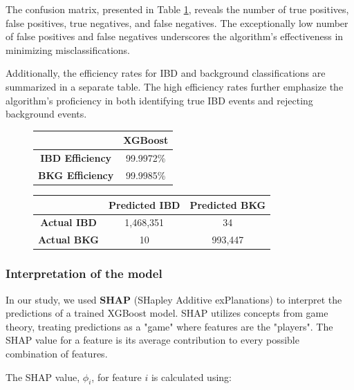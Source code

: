 The confusion matrix, presented in Table \ref{tab:conf_matrix_xgb}, reveals the number of true positives, false positives, true negatives, and false negatives. The exceptionally low number of false positives and false negatives underscores the algorithm's effectiveness in minimizing misclassifications.

Additionally, the efficiency rates for IBD and background classifications are summarized in a separate table. The high efficiency rates further emphasize the algorithm's proficiency in both identifying true IBD events and rejecting background events.


\begin{figure}[h]
	\centering
	\begin{minipage}{0.33\textwidth}
	\centering
	\begin{tabular}{cc}
		\toprule
		& \textbf{XGBoost} \\
		\midrule
		\textbf{IBD Efficiency} & 99.9972\% \\
		\textbf{BKG Efficiency} & 99.9985\% \\
		\bottomrule
	\end{tabular}
	\end{minipage}
	\begin{minipage}{0.65\textwidth}
	\centering
	\begin{tabular}{ccc}
		\toprule
		& \textbf{Predicted IBD} & \textbf{Predicted BKG} \\
		\midrule
		\textbf{Actual IBD} & 1,468,351 & 34 \\
		\textbf{Actual BKG} & 10 & 993,447 \\
		\bottomrule
	\end{tabular}
	\label{tab:conf_matrix_xgb}
\end{minipage}
\end{figure}




\subsubsection{Interpretation of the model}
In our study, we used \textbf{SHAP} (SHapley Additive exPlanations) to interpret the predictions of a trained XGBoost model. SHAP utilizes concepts from game theory, treating predictions as a "game" where features are the "players". The SHAP value for a feature is its average contribution to every possible combination of features.

The SHAP value, \(\phi_i\), for feature \(i\) is calculated using:


